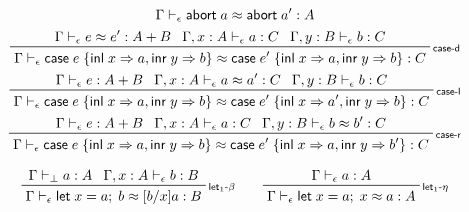 \documentclass[acmsmall,screen,review]{acmart}
\newcommand{\ms}[1]{\ensuremath{\mathsf{#1}}}
\newcommand{\lto}{\Rightarrow}
\newcommand{\linl}[1]{\ms{inl}\;{#1}}
\newcommand{\linr}[1]{\ms{inr}\;{#1}}
\newcommand{\labort}[1]{\ms{abort}\;{#1}}
\newcommand{\letexpr}[3]{\ensuremath{\ms{let}\;#1 = #2;\;#3}}
\newcommand{\caseexpr}[5]{\ms{case}\;#1\;\{\linl{#2} \lto #3, \linr{#4} \lto #5\}}
\newcommand{\bhyp}[2]{#1 : #2}
\newcommand{\rle}[1]{{\scriptsize\textsf{#1}}}
\newcommand{\hasty}[4]{#1 \vdash_{#2} #3: {#4}}
\newcommand{\teqv}{\approx}
\newcommand{\tmeq}[5]{#1 \vdash_{#2} #3 \teqv #4 : {#5}}
\begin{document}
\begin{gather*}
    {\tmeq{\Gamma}{\epsilon}{\labort{a}}{\labort{a'}}{A}}
  \\
  \prftree[r]{\rle{case-d}}
    {\tmeq{\Gamma}{\epsilon}{e}{e'}{A + B}}
    {\hasty{\Gamma, \bhyp{x}{A}}{\epsilon}{a}{C}}
    {\hasty{\Gamma, \bhyp{y}{B}}{\epsilon}{b}{C}}
    {\tmeq{\Gamma}{\epsilon}{\caseexpr{e}{x}{a}{y}{b}}{\caseexpr{e'}{x}{a}{y}{b}}{C}}
  \\
  \prftree[r]{\rle{case-l}}
    {\hasty{\Gamma}{\epsilon}{e}{A + B}}
    {\tmeq{\Gamma, \bhyp{x}{A}}{\epsilon}{a}{a'}{C}}
    {\hasty{\Gamma, \bhyp{y}{B}}{\epsilon}{b}{C}}
    {\tmeq{\Gamma}{\epsilon}{\caseexpr{e}{x}{a}{y}{b}}{\caseexpr{e'}{x}{a'}{y}{b}}{C}}
  \\
  \prftree[r]{\rle{case-r}}
    {\hasty{\Gamma}{\epsilon}{e}{A + B}}
    {\hasty{\Gamma, \bhyp{x}{A}}{\epsilon}{a}{C}}
    {\tmeq{\Gamma, \bhyp{y}{B}}{\epsilon}{b}{b'}{C}}
    {\tmeq{\Gamma}{\epsilon}{\caseexpr{e}{x}{a}{y}{b}}{\caseexpr{e'}{x}{a}{y}{b'}}{C}}
\end{gather*}


\begin{gather*}
  \prftree[r]{\rle{let$_1$-$\beta$}}
    {\hasty{\Gamma}{\bot}{a}{A}}
    {\hasty{\Gamma, \bhyp{x}{A}}{\epsilon}{b}{B}}
    {\tmeq{\Gamma}{\epsilon}{\letexpr{x}{a}{b}}{[b/x]a}{B}}
  \qquad
  \prftree[r]{\rle{let$_1$-$\eta$}}
    {\hasty{\Gamma}{\epsilon}{a}{A}}
    {\tmeq{\Gamma}{\epsilon}{\letexpr{x}{a}{x}}{a}{A}}
\end{gather*}
\end{document}
